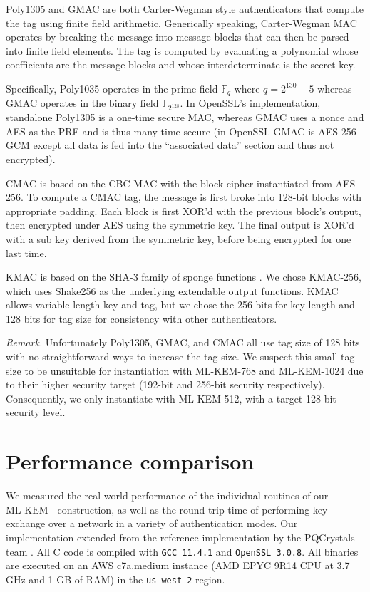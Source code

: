 \documentclass[journal=tches,submission]{iacrtrans}
\def\mlkemplus{\text{ML-KEM}^+}
\begin{document}
Poly1305 and GMAC are both Carter-Wegman style authenticators \cite{wegman1981new} that compute the tag using finite field arithmetic. Generically speaking, Carter-Wegman MAC operates by breaking the message into message blocks that can then be parsed into finite field elements. The tag is computed by evaluating a polynomial whose coefficients are the message blocks and whose interdeterminate is the secret key.

Specifically, Poly1035 operates in the prime field $\mathbb{F}_q$ where $q = 2^{130} - 5$ whereas GMAC operates in the binary field $\mathbb{F}_{2^{128}}$. In OpenSSL's implementation, standalone Poly1305 is a one-time secure MAC, whereas GMAC uses a nonce and AES as the PRF and is thus many-time secure (in OpenSSL GMAC is AES-256-GCM except all data is fed into the ``associated data'' section and thus not encrypted).

CMAC is based on the CBC-MAC with the block cipher instantiated from AES-256. To compute a CMAC tag, the message is first broke into 128-bit blocks with appropriate padding. Each block is first XOR'd with the previous block's output, then encrypted under AES using the symmetric key. The final output is XOR'd with a sub key derived from the symmetric key, before being encrypted for one last time.

KMAC is based on the SHA-3 family of sponge functions \cite{FIPS202}. We chose KMAC-256, which uses Shake256 as the underlying extendable output functions. KMAC allows variable-length key and tag, but we chose the 256 bits for key length and 128 bits for tag size for consistency with other authenticators.

\emph{Remark.} Unfortunately Poly1305, GMAC, and CMAC all use tag size of 128 bits with no straightforward ways to increase the tag size. We suspect this small tag size to be unsuitable for instantiation with ML-KEM-768 and ML-KEM-1024 due to their higher security target (192-bit and 256-bit security respectively). Consequently, we only instantiate with ML-KEM-512, with a target 128-bit security level.

\section{Performance comparison}\label{sec:performance-comparison}
We measured the real-world performance of the individual routines of our $\mlkemplus$ construction, as well as the round trip time of performing key exchange over a network in a variety of authentication modes. Our implementation extended from the reference implementation by the PQCrystals team \cite{kyberrefimpl}. All C code is compiled with \texttt{GCC 11.4.1} and \texttt{OpenSSL 3.0.8}. All binaries are executed on an AWS c7a.medium instance (AMD EPYC 9R14 CPU at 3.7 GHz and 1 GB of RAM) in the \texttt{us-west-2} region.
\end{document}
